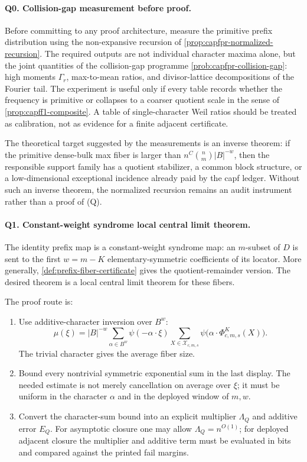 \documentclass[11pt]{article}
\theoremstyle{definition}
\theoremstyle{remark}
\newcommand{\B}{B}
\begin{document}
\paragraph{Q0. Collision-gap measurement before proof.}
Before committing to any proof architecture, measure the primitive prefix distribution using the non-expansive recursion of \cref{prop:capfpr-normalized-recursion}.  The required outputs are not individual character maxima alone, but the joint quantities of the collision-gap programme \cref{prob:capfpr-collision-gap}: high moments $\Gamma_r$, max-to-mean ratios, and divisor-lattice decompositions of the Fourier tail.  The experiment is useful only if every table records whether the frequency is primitive or collapses to a coarser quotient scale in the sense of \cref{prop:capff1-composite}.  A table of single-character Weil ratios should be treated as calibration, not as evidence for a finite adjacent certificate.

The theoretical target suggested by the measurements is an inverse theorem: if the primitive dense-bulk max fiber is larger than $n^C\binom nm|\B|^{-w}$, then the responsible support family has a quotient stabilizer, a common block structure, or a low-dimensional exceptional incidence already paid by the capf ledger.  Without such an inverse theorem, the normalized recursion remains an audit instrument rather than a proof of \textup{(Q)}.

\paragraph{Q1. Constant-weight syndrome local central limit theorem.}
The identity prefix map is a constant-weight syndrome map: an $m$-subset of $D$ is sent to the first $w=m-K$ elementary-symmetric coefficients of its locator.  More generally, \cref{def:prefix-fiber-certificate} gives the quotient-remainder version.  The desired theorem is a local central limit theorem for these fibers.

The proof route is:
\begin{enumerate}[label=\textup{Q1.\arabic*},leftmargin=3.0em]
\item Use additive-character inversion over $\B^w$:
\[
        \mu(\xi)
        = |\B|^{-w}\sum_{\alpha\in\B^w}\psi(-\alpha\cdot\xi)
          \sum_{X\in\mathcal X_{c,m,s}}
          \psi\bigl(\alpha\cdot\Phi_{c,m,s}^{K}(X)\bigr).
\]
The trivial character gives the average fiber size.
\item Bound every nontrivial symmetric exponential sum in the last display.  The needed estimate is not merely cancellation on average over $\xi$; it must be uniform in the character $\alpha$ and in the deployed window of $m,w$.
\item Convert the character-sum bound into an explicit multiplier $\Lambda_Q$ and additive error $E_Q$.  For asymptotic closure one may allow $\Lambda_Q=n^{O(1)}$; for deployed adjacent closure the multiplier and additive term must be evaluated in bits and compared against the printed fail margins.
\end{enumerate}
\end{document}
